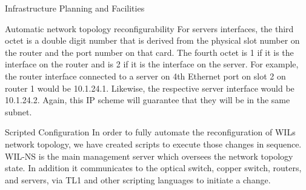 \documentclass{IEEEtran}
\begin{document}
\begin{section}{Infrastructure Planning and Facilities}
\begin{subsection}{Automatic network topology reconfigurability}
For servers interfaces, the third octet is a double digit number that is
derived from the physical slot number on the router and the port number
on that card. The fourth octet is 1 if it is the interface on the router
and is 2 if it is the interface on the server. For example, the router
interface connected to a server on 4th Ethernet port on slot 2 on router
1 would be 10.1.24.1. Likewise, the respective server interface would
be 10.1.24.2. Again, this IP scheme will guarantee that they will be in
the same subnet.
\end{subsection}

\begin{subsection}{Scripted Configuration}
In order to fully automate the reconfiguration of WILs network topology,
we have created scripts to execute those changes in sequence. WIL-NS is
the main management server which oversees the network topology state. In
addition it communicates to the optical switch, copper switch, routers,
and servers, via TL1 and other scripting languages to initiate a change.
\end{subsection}

\end{section}
\end{document}
